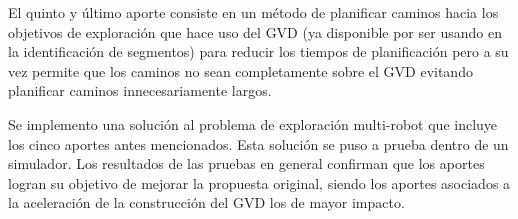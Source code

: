 El quinto y último aporte consiste en un método de planificar caminos hacia
los objetivos de exploración que hace uso del GVD (ya disponible por ser usando
en la identificación de segmentos) para reducir los tiempos de planificación
pero a su vez permite que los caminos no sean completamente sobre el GVD evitando
planificar caminos innecesariamente largos.

Se implemento una solución al problema de exploración multi-robot que incluye
los cinco aportes antes mencionados. Esta solución se puso a prueba dentro de un
simulador. Los resultados de las pruebas en general confirman que los aportes
logran su objetivo de mejorar la propuesta original, siendo los aportes 
asociados a la aceleración de la construcción del GVD los de mayor impacto.

